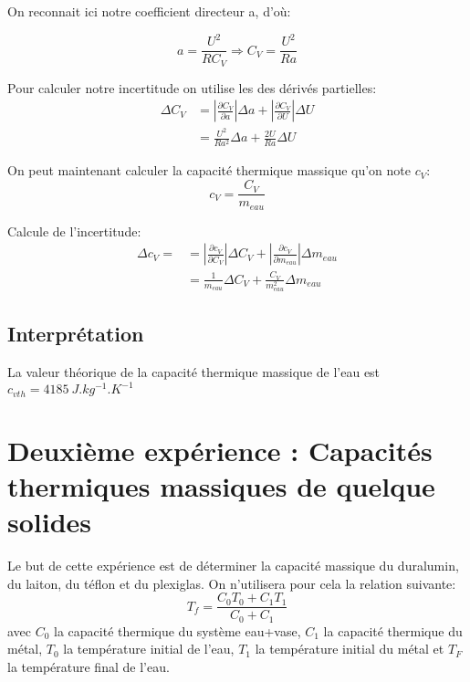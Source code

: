 \documentclass[12pt]{article}
\begin{document}
On reconnait ici notre coefficient directeur a, d'où:

\begin{equation}
a=\frac{U^2}{RC_V} \Rightarrow C_V=\frac{U^2}{Ra}
\end{equation}	

Pour calculer notre incertitude on utilise les des dérivés partielles:
\begin{align}
\Delta C_V &=\displaystyle\left\lvert \frac{\partial C_V}{\partial a}\right\rvert \Delta a + \displaystyle\left\lvert  \frac{\partial C_V}{\partial U}\right\rvert \Delta U \\
&=\frac{U^2}{Ra^2}\Delta a +\frac{2U}{Ra}\Delta U
\end{align}

On peut maintenant calculer la capacité thermique massique qu'on note $c_V$:
\begin{equation}
c_V=\frac{C_V}{m_{eau}}
\end{equation}

Calcule de l'incertitude:
\begin{align}
\Delta c_V=&=\displaystyle\left\lvert \frac{\partial c_V}{\partial C_V}\right\rvert \Delta C_V + \displaystyle\left\lvert  \frac{\partial c_V}{\partial m_{eau}}\right\rvert \Delta m_{eau} \\
&=\frac{1}{m_{eau}}\Delta C_V + \frac{C_V}{m_{eau}^2}\Delta m_{eau}
\end{align}

\subsection{Interprétation}

La valeur théorique de la capacité thermique massique de l'eau est $c_{vth }=4185 ~ J.kg^{-1}.K^{-1}$

\section{Deuxième expérience : Capacités thermiques massiques de quelque solides}

Le but de cette expérience est de déterminer la capacité massique du duralumin, du laiton, du téflon et du plexiglas. On n'utilisera pour cela la relation suivante:
\begin{equation}
T_f=\frac{C_0T_0+C_1T_1}{C_0+C_1}
\label{EquationTf}
\end{equation}
avec $C_0$ la capacité thermique du système {eau+vase}, $C_1$ la capacité thermique du métal, $T_0$ la température initial de l'eau, $T_1$ la température initial du métal et $T_F$ la température final de l'eau.
\end{document}
